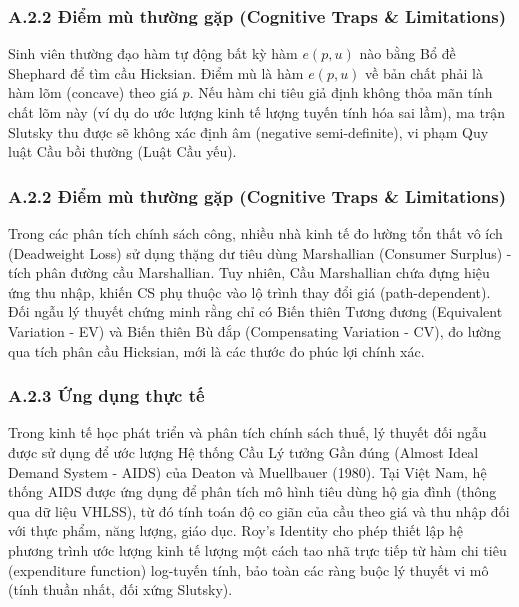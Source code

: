 \documentclass[
]{article}
\begin{document}
\subsubsection{A.2.2 Điểm mù thường gặp (Cognitive Traps \&
Limitations)}\label{a.2.2-ux111iux1ec3m-muxf9-thux1b0ux1eddng-gux1eb7p-cognitive-traps-limitations}

Sinh viên thường đạo hàm tự động bất kỳ hàm \(e(p, u)\) nào bằng Bổ đề
Shephard để tìm cầu Hicksian. Điểm mù là hàm \(e(p, u)\) về bản chất
phải là hàm lõm (concave) theo giá \(p\). Nếu hàm chi tiêu giả định
không thỏa mãn tính chất lõm này (ví dụ do ước lượng kinh tế lượng tuyến
tính hóa sai lầm), ma trận Slutsky thu được sẽ không xác định âm
(negative semi-definite), vi phạm Quy luật Cầu bồi thường (Luật Cầu
yếu).

\subsubsection{A.2.2 Điểm mù thường gặp (Cognitive Traps \&
Limitations)}\label{a.2.2-ux111iux1ec3m-muxf9-thux1b0ux1eddng-gux1eb7p-cognitive-traps-limitations-1}

Trong các phân tích chính sách công, nhiều nhà kinh tế đo lường tổn thất
vô ích (Deadweight Loss) sử dụng thặng dư tiêu dùng Marshallian
(Consumer Surplus) - tích phân đường cầu Marshallian. Tuy nhiên, Cầu
Marshallian chứa đựng hiệu ứng thu nhập, khiến CS phụ thuộc vào lộ trình
thay đổi giá (path-dependent). Đối ngẫu lý thuyết chứng minh rằng chỉ có
Biến thiên Tương đương (Equivalent Variation - EV) và Biến thiên Bù đắp
(Compensating Variation - CV), đo lường qua tích phân cầu Hicksian, mới
là các thước đo phúc lợi chính xác.

\subsubsection{A.2.3 Ứng dụng thực
tế}\label{a.2.3-ux1ee9ng-dux1ee5ng-thux1ef1c-tux1ebf}

Trong kinh tế học phát triển và phân tích chính sách thuế, lý thuyết đối
ngẫu được sử dụng để ước lượng Hệ thống Cầu Lý tưởng Gần đúng (Almost
Ideal Demand System - AIDS) của Deaton và Muellbauer (1980). Tại Việt
Nam, hệ thống AIDS được ứng dụng để phân tích mô hình tiêu dùng hộ gia
đình (thông qua dữ liệu VHLSS), từ đó tính toán độ co giãn của cầu theo
giá và thu nhập đối với thực phẩm, năng lượng, giáo dục. Roy's Identity
cho phép thiết lập hệ phương trình ước lượng kinh tế lượng một cách tao
nhã trực tiếp từ hàm chi tiêu (expenditure function) log-tuyến tính, bảo
toàn các ràng buộc lý thuyết vi mô (tính thuần nhất, đối xứng Slutsky).
\end{document}
